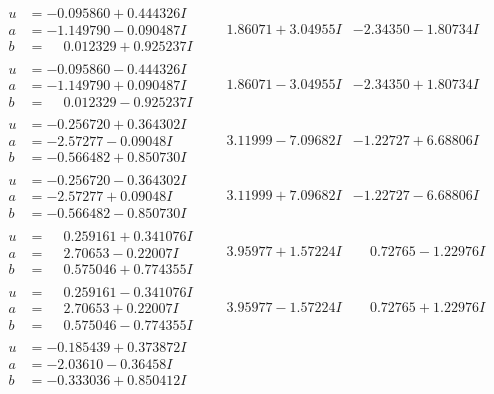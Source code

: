 \documentclass[1p]{elsarticle_modified}
\theoremstyle{definition}
\begin{document}
$$\begin{array}{c|c|c}
\begin{aligned}
u &= -0.095860 + 0.444326 I \\
a &= -1.149790 - 0.090487 I \\
b &= \phantom{-}0.012329 + 0.925237 I\end{aligned}
 & \phantom{-}1.86071 + 3.04955 I & -2.34350 - 1.80734 I \\ \hline\begin{aligned}
u &= -0.095860 - 0.444326 I \\
a &= -1.149790 + 0.090487 I \\
b &= \phantom{-}0.012329 - 0.925237 I\end{aligned}
 & \phantom{-}1.86071 - 3.04955 I & -2.34350 + 1.80734 I \\ \hline\begin{aligned}
u &= -0.256720 + 0.364302 I \\
a &= -2.57277 - 0.09048 I \\
b &= -0.566482 + 0.850730 I\end{aligned}
 & \phantom{-}3.11999 - 7.09682 I & -1.22727 + 6.68806 I \\ \hline\begin{aligned}
u &= -0.256720 - 0.364302 I \\
a &= -2.57277 + 0.09048 I \\
b &= -0.566482 - 0.850730 I\end{aligned}
 & \phantom{-}3.11999 + 7.09682 I & -1.22727 - 6.68806 I \\ \hline\begin{aligned}
u &= \phantom{-}0.259161 + 0.341076 I \\
a &= \phantom{-}2.70653 - 0.22007 I \\
b &= \phantom{-}0.575046 + 0.774355 I\end{aligned}
 & \phantom{-}3.95977 + 1.57224 I & \phantom{-}0.72765 - 1.22976 I \\ \hline\begin{aligned}
u &= \phantom{-}0.259161 - 0.341076 I \\
a &= \phantom{-}2.70653 + 0.22007 I \\
b &= \phantom{-}0.575046 - 0.774355 I\end{aligned}
 & \phantom{-}3.95977 - 1.57224 I & \phantom{-}0.72765 + 1.22976 I \\ \hline\begin{aligned}
u &= -0.185439 + 0.373872 I \\
a &= -2.03610 - 0.36458 I \\
b &= -0.333036 + 0.850412 I\end{aligned}

\end{array}$$
\end{document}
